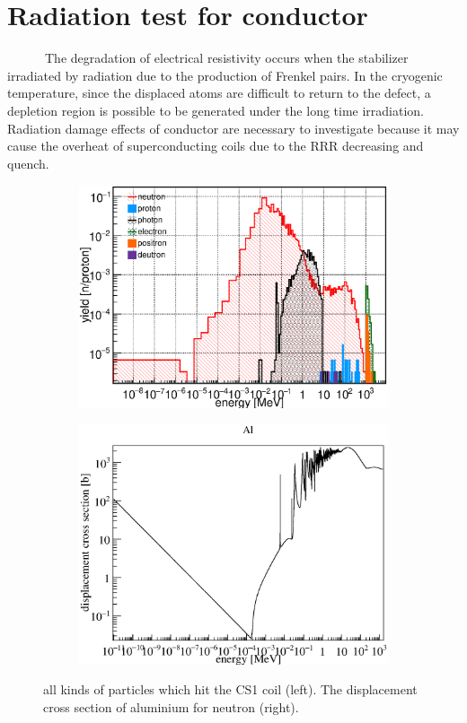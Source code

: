  \section{Radiation test for conductor}
~~~~~~The degradation of electrical resistivity occurs when the stabilizer irradiated by radiation due to the production of Frenkel pairs.
In the cryogenic temperature, since the displaced atoms are difficult to return to the defect, a depletion region is possible to be generated under the long time irradiation.
Radiation damage effects of conductor are necessary to investigate because it may cause the overheat of superconducting coils due to the RRR decreasing and quench.
\begin{figure}[H]
 \begin{subfigure}{0.3\textwidth}
  \centering
  \includegraphics[scale=0.43]{chapter4/fig/yield.eps}
 \end{subfigure}
 \hspace{0.2\textwidth}
 \begin{subfigure}{0.3\textwidth}
  \centering
  \includegraphics[scale=0.43]{chapter5/fig/AlDPA.eps}
 \end{subfigure}
 \caption{all kinds of particles which hit the CS1 coil (left). The displacement cross section of aluminium for neutron (right).}
 \label{3yield}
\end{figure}
